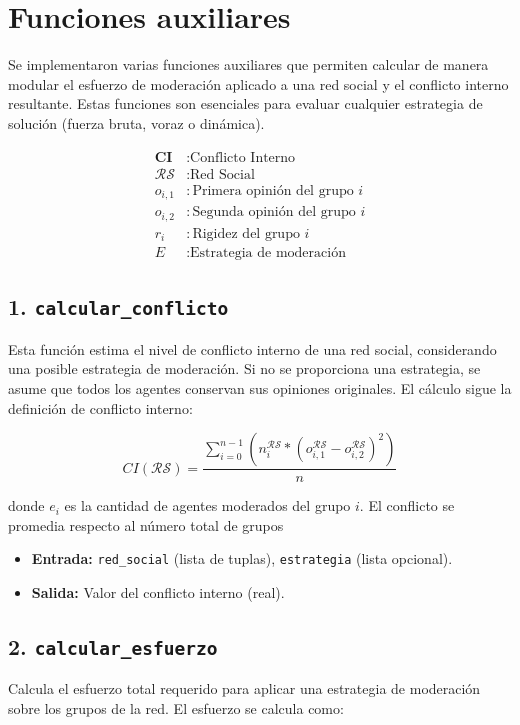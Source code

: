 \documentclass[11pt,letter]{article}
\begin{document}
    \section{Funciones auxiliares}

    Se implementaron varias funciones auxiliares que permiten calcular de manera modular el esfuerzo de moderación aplicado a una red social y el conflicto interno resultante. Estas funciones son esenciales para evaluar cualquier estrategia de solución (fuerza bruta, voraz o dinámica).

    \[
        \begin{aligned}
            \textbf{CI} &: \text{Conflicto Interno} \\
            \mathcal{RS} &: \text{Red Social} \\
            o_{i,1} &: \text{Primera opinión del grupo } i \\
            o_{i,2} &: \text{Segunda opinión del grupo } i \\
            r_i &: \text{Rigidez del grupo } i \\
            E &: \text{Estrategia de moderación}
        \end{aligned}
    \]


    \subsection*{1. \texttt{calcular\_conflicto}}
    Esta función estima el nivel de conflicto interno de una red social, considerando una posible estrategia de moderación. Si no se proporciona una estrategia, se asume que todos los agentes conservan sus opiniones originales. El cálculo sigue la definición de conflicto interno:

    \[
        CI(\mathcal{RS}) = \frac{\sum_{i=0}^{n-1} \left(n_i^\mathcal{RS} \ast \left(o_{i,1}^\mathcal{RS} - o_{i,2}^\mathcal{RS}\right)^2\right)}{n}
    \]

    donde $e_i$ es la cantidad de agentes moderados del grupo $i$. El conflicto se promedia respecto al número total de grupos

    \begin{itemize}
        \item \textbf{Entrada:} \texttt{red\_social} (lista de tuplas), \texttt{estrategia} (lista opcional).
        \item \textbf{Salida:} Valor del conflicto interno (real).
    \end{itemize}

    \subsection*{2. \texttt{calcular\_esfuerzo}}
    Calcula el esfuerzo total requerido para aplicar una estrategia de moderación sobre los grupos de la red. El esfuerzo se calcula como:
\end{document}
